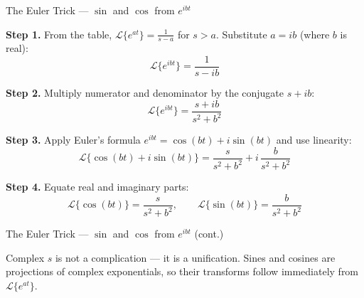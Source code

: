 \documentclass[aspectratio=169,11pt]{beamer}
\begin{document}
\begin{frame}{The Euler Trick --- $\sin$ and $\cos$ from $e^{ibt}$}
\footnotesize
\begin{examplebox}
\textbf{Step 1.} From the table, $\mathcal{L}\{e^{at}\} = \frac{1}{s-a}$ for $s > a$. Substitute $a = ib$ (where $b$ is real):
\[\mathcal{L}\{e^{ibt}\} = \frac{1}{s - ib}\]

\textbf{Step 2.} Multiply numerator and denominator by the conjugate $s + ib$:
\[\mathcal{L}\{e^{ibt}\} = \frac{s + ib}{s^2 + b^2}\]

\textbf{Step 3.} Apply Euler's formula $e^{ibt} = \cos(bt) + i\sin(bt)$ and use linearity:
\[\mathcal{L}\{\cos(bt) + i\sin(bt)\} = \frac{s}{s^2+b^2} + i\,\frac{b}{s^2+b^2}\]

\textbf{Step 4.} Equate real and imaginary parts:
\[\mathcal{L}\{\cos(bt)\} = \frac{s}{s^2+b^2}, \qquad \mathcal{L}\{\sin(bt)\} = \frac{b}{s^2+b^2}\]
\end{examplebox}
\end{frame}

\begin{frame}{The Euler Trick --- $\sin$ and $\cos$ from $e^{ibt}$ (cont.)}
\footnotesize
\begin{conceptbox}
Complex $s$ is not a complication --- it is a unification. Sines and cosines are projections of complex exponentials, so their transforms follow immediately from $\mathcal{L}\{e^{at}\}$.
\end{conceptbox}
\end{frame}
\end{document}
